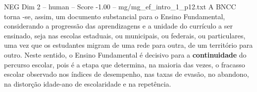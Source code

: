 \begin{textsample}{NEG Dim 2 – human – Score -1.00 – mg/mg\_ef\_intro\_1\_p12.txt}  \label{ex:f2_neg_007}
A BNCC torna -se, assim, um documento substancial para o Ensino Fundamental, considerando a progressão das aprendizagens e a unidade do currículo a ser ensinado, seja nas escolas estaduais, ou municipais, ou federais, ou particulares, uma vez que os estudantes migram de uma rede para outra, de um território para outro.
Neste sentido, o Ensino Fundamental é decisivo para a \textbf{continuidade} do percurso escolar, pois é a etapa que determina, na maioria das vezes, o fracasso escolar observado nos índices de desempenho, nas taxas de evasão, no abandono, na distorção idade-ano de escolaridade e na repetência.

\end{textsample}
